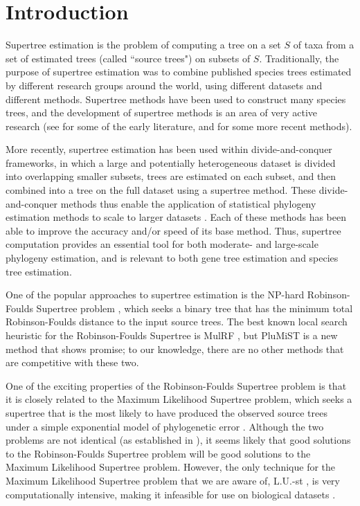 
\section{Introduction}

Supertree estimation is the problem of computing a tree on a set $S$ of taxa from a set of estimated  trees (called ``source trees") on subsets of $S$. 
Traditionally, the purpose of supertree estimation was 
to combine published species trees estimated by different research groups around the world, using different datasets and different methods. 
Supertree methods have been used
to construct many species trees,
and the development of supertree methods is an area 
of very active research
(see 
\cite{bininda2004phylogenetic} for some of the early literature,
and \cite{mrl,superfine,Akanni-MLsupertree} for some more recent methods).

More recently, supertree estimation has been used within divide-and-conquer frameworks, in which a large and potentially heterogeneous dataset is divided into overlapping smaller subsets, trees are estimated on each subset, and then combined into a tree on the full dataset using a supertree method. 
These divide-and-conquer methods thus enable the application of  statistical phylogeny estimation methods to scale to larger datasets
\cite{dactal,BayzidRECOMBCG2014,afc,dcm1-huson}.
Each of these methods has been able to improve the accuracy and/or speed of its base method.  
Thus, supertree computation provides an essential tool for both moderate- and large-scale phylogeny estimation, and is relevant to both gene tree estimation and species tree estimation. 

One of the popular approaches to supertree estimation is the
NP-hard
Robinson-Foulds Supertree problem \cite{bansal2010robinson}, which 
seeks a binary tree that has the minimum total Robinson-Foulds
\cite{RF} distance to the input source trees.
The best known local search 
heuristic for the Robinson-Foulds Supertree
is MulRF \cite{mulrf}, but
PluMiST \cite{plumist} is a new method that
shows promise; 
to our knowledge, there are no
other methods that are competitive with these two.

One of the exciting properties of the
Robinson-Foulds Supertree problem is that it is closely
related to  the Maximum Likelihood Supertree problem,
which seeks a supertree that is the most likely to
have produced the observed source trees under a simple
exponential
model of phylogenetic error \cite{ml-supertree}.
Although the two problems are not identical
(as established in \cite{BryantSteel2009}),
it seems likely that 
good solutions to the
Robinson-Foulds Supertree problem will 
be good solutions to the Maximum 
Likelihood Supertree problem. 
However, 
the only technique for
the Maximum Likelihood Supertree problem that we are
aware of,  L.U.-st \cite{Akanni-MLsupertree},
is very computationally intensive, making it
infeasible for use
on biological datasets \cite{Akanni-Bayesian}.


